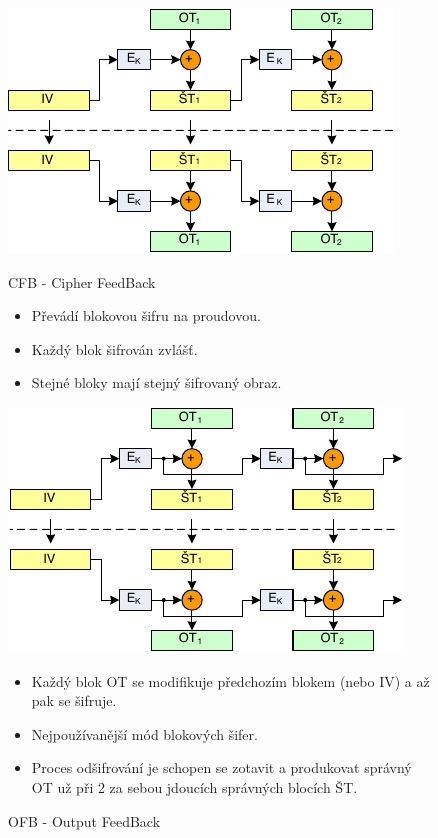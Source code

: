 \documentclass{szzclass}
\begin{document}
\begin{figure}[ht!]
\centering
\begin{minipage}{.5\textwidth}
  \centering
  \includegraphics[width=.75\linewidth]{topics/bi-spol-07/images/cfb}
  \caption{CFB - Cipher FeedBack}
  \begin{itemize}
  \item Převádí blokovou šifru na proudovou.
  \item Každý blok šifrován zvlášť.
  \item Stejné bloky mají stejný šifrovaný obraz.
  \end{itemize}
\end{minipage}%
\begin{minipage}{.5\textwidth}
  \centering
  \includegraphics[width=.75\linewidth]{topics/bi-spol-07/images/ofb}
  \caption{OFB - Output FeedBack}
  \begin{itemize}
  \item Každý blok OT se modifikuje předchozím blokem (nebo IV) a až pak se šifruje.
  \item Nejpoužívanější mód blokových šifer.
  \item Proces odšifrování je schopen se zotavit a produkovat správný OT už při 2 za sebou jdoucích správných blocích ŠT.
  \end{itemize}
\end{minipage}
\end{figure}
\end{document}

